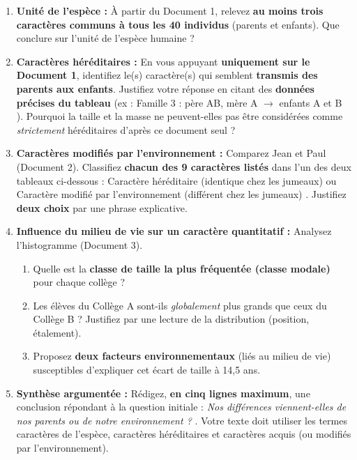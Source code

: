 \documentclass[11pt]{article}
\newcommand{\cle}[1]{{\popxbold\color{popdark}#1}}
\begin{document}
\begin{enumerate}
    \item \textbf{Unité de l'espèce :} À partir du Document 1, relevez \textbf{au moins trois caractères communs à tous les 40 individus} (parents et enfants). Que conclure sur l'unité de l'espèce humaine ?
    \item \textbf{Caractères héréditaires :} En vous appuyant \textbf{uniquement sur le Document 1}, identifiez le(s) caractère(s) qui semblent \textbf{transmis des parents aux enfants}. Justifiez votre réponse en citant des \textbf{données précises du tableau} (ex : \og Famille 3 : père AB, mère A $\to$ enfants A et B \fg). Pourquoi la taille et la masse ne peuvent-elles pas être considérées comme \emph{strictement} héréditaires d'après ce document seul ?
    \item \textbf{Caractères modifiés par l'environnement :} Comparez Jean et Paul (Document 2). Classifiez \textbf{chacun des 9 caractères listés} dans l'un des deux tableaux ci-dessous : \og Caractère héréditaire (identique chez les jumeaux) \fg ou \og Caractère modifié par l'environnement (différent chez les jumeaux) \fg. Justifiez \textbf{deux choix} par une phrase explicative.
    \item \textbf{Influence du milieu de vie sur un caractère quantitatif :} Analysez l'histogramme (Document 3).
    \begin{enumerate}
        \item Quelle est la \textbf{classe de taille la plus fréquentée (classe modale)} pour chaque collège ?
        \item Les élèves du Collège A sont-ils \emph{globalement} plus grands que ceux du Collège B ? Justifiez par une lecture de la distribution (position, étalement).
        \item Proposez \textbf{deux facteurs environnementaux} (liés au milieu de vie) susceptibles d'expliquer cet écart de taille à 14,5 ans.
    \end{enumerate}
    \item \textbf{Synthèse argumentée :} Rédigez, \textbf{en cinq lignes maximum}, une conclusion répondant à la question initiale : \og \emph{Nos différences viennent-elles de nos parents ou de notre environnement ?} \fg. Votre texte doit utiliser les termes \cle{caractères de l'espèce}, \cle{caractères héréditaires} et \cle{caractères acquis (ou modifiés par l'environnement)}.
\end{enumerate}
\end{document}
